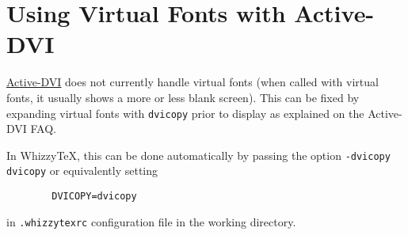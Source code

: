 \documentclass{article}
\def \WhizzyTeX{Whizzy\TeX}
\begin{document}
\section{Using Virtual Fonts with Active-DVI}

\href{http://pauillac.inria.fr/advi/}{Active-DVI}
does not currently handle virtual fonts (when called with virtual fonts, it
usually shows a more or less blank screen). This can be fixed by expanding
virtual fonts with \texttt{dvicopy} prior to display as explained on the
{Active-DVI} FAQ.

In {\WhizzyTeX}, this can be done automatically by passing the option
\texttt{-dvicopy dvicopy} or equivalently setting
\begin{verbatim}
        DVICOPY=dvicopy
\end{verbatim}
in \texttt{.whizzytexrc} configuration file in the working directory.
\end{document}
